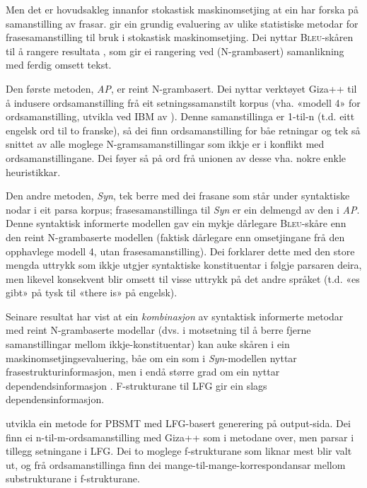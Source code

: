\documentclass[11pt,a4paper,oneside,draft]{book}
\newcommand{\Bleu}{\textsc{Bleu}}
\begin{document}
Men det er hovudsakleg innanfor stokastisk maskinomsetjing at ein har
forska på samanstilling av frasar. \citet{koehn2003spb} gir ein
grundig evaluering av ulike statistiske metodar for frasesamanstilling
til bruk i stokastisk maskinomsetjing. Dei nyttar \Bleu-skåren til å
rangere resultata
\citep[Papineni~et~al.,~2001,~i][s.~51]{koehn2003spb}, som gir ei
rangering ved (N-grambasert) samanlikning med ferdig omsett tekst.

Den første metoden, \emph{AP}, er reint N-grambasert. Dei nyttar verktøyet
Giza++ \citep[Och~og~Ney,~2000,~i][s.~50]{koehn2003spb} til å indusere
ordsamanstilling frå eit setningssamanstilt korpus (vha. «modell 4»
for ordsamanstilling, utvikla ved IBM av \citet{brown1993msm}). Denne
samanstillinga er 1-til-n (t.d. eitt engelsk ord til to franske), så
dei finn ordsamanstilling for båe retningar og tek så snittet av alle
moglege N-gramsamanstillingar som ikkje er i konflikt med
ordsamanstillingane. Dei føyer så på ord frå unionen av desse
vha. nokre enkle heuristikkar.

Den andre metoden, \emph{Syn}, tek berre med dei frasane som står under
syntaktiske nodar i eit parsa korpus; frasesamanstillinga til \emph{Syn} er
ein delmengd av den i \emph{AP}. Denne syntaktisk informerte modellen gav ein
mykje dårlegare \Bleu-skåre enn den reint N-grambaserte
modellen (faktisk dårlegare enn omsetjingane frå den opphavlege modell
4, utan frasesamanstilling). Dei forklarer dette med den store mengda
uttrykk som ikkje utgjer syntaktiske konstituentar i følgje parsaren
deira, men likevel konsekvent blir omsett til visse uttrykk på det
andre språket (t.d. «es gibt» på tysk til «there is» på engelsk).

Seinare resultat har vist at ein \emph{kombinasjon} av syntaktisk
informerte metodar med reint N-grambaserte modellar (dvs. i motsetning
til å berre fjerne samanstillingar mellom ikkje-konstituentar) kan
auke skåren i ein maskinomsetjingsevaluering, båe om ein som i
\emph{Syn}-modellen nyttar frasestrukturinformasjon, men i endå større grad
om ein nyttar dependendsinformasjon
\citep{tinsley2007ept,hearne2008ccd}. F-strukturane til LFG gir ein
slags dependensinformasjon.

\citet{riezler2006gmt} utvikla ein metode for PBSMT med LFG-basert
generering på output-sida. Dei finn ei n-til-m-ordsamanstilling med
Giza++ som i metodane over, men parsar i tillegg setningane i LFG. Dei
to moglege f-strukturane som liknar mest blir valt ut, og frå
ordsamanstillinga finn dei mange-til-mange-korrespondansar mellom
substrukturane i f-strukturane.
\end{document}

